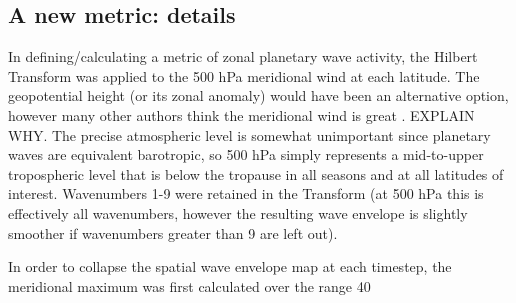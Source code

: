 \subsection{A new metric: details}

In defining/calculating a metric of zonal planetary wave activity, the Hilbert Transform was applied to the 500 hPa meridional wind at each latitude. The geopotential height (or its zonal anomaly) would have been an alternative option, however many other authors think the meridional wind is great \citep[e.g.][p.365]{Hope2014}. EXPLAIN WHY. The precise atmospheric level is somewhat unimportant since planetary waves are equivalent barotropic, so 500 hPa simply represents a mid-to-upper tropospheric level that is below the tropause in all seasons and at all latitudes of interest. Wavenumbers 1-9 were retained in the Transform (at 500 hPa this is effectively all wavenumbers, however the resulting wave envelope is slightly smoother if wavenumbers greater than 9 are left out).

In order to collapse the spatial wave envelope map at each timestep, the meridional maximum was first calculated over the range 40

